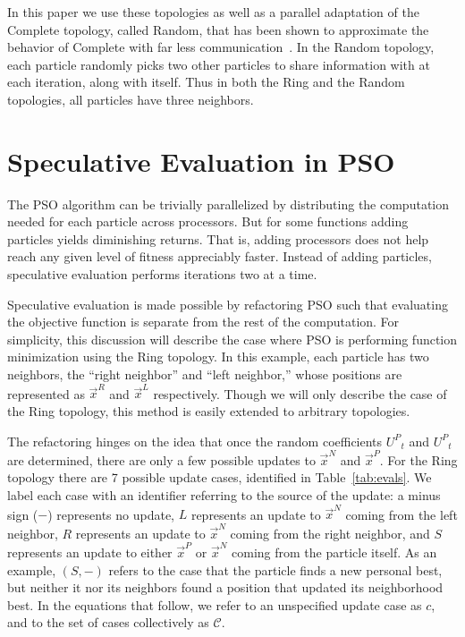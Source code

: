 \documentclass{llncs}
\providecommand{\pers}{\ensuremath{P}}
\providecommand{\neigh}{\ensuremath{N}}
\providecommand{\leftind}{\ensuremath{L}}
\providecommand{\rightind}{\ensuremath{R}}
\providecommand{\pURand}{\ensuremath{U^\pers}}
\providecommand{\nbest}{\ensuremath{\Vec{x}^\neigh}}
\providecommand{\pbest}{\ensuremath{\Vec{x}^\pers}}
\providecommand{\leftn}{\ensuremath{\Vec{x}^\leftind}}
\providecommand{\rightn}{\ensuremath{\Vec{x}^\rightind}}
\providecommand{\caseset}{\ensuremath{\mathcal{C}}}
\providecommand{\casegen}{\ensuremath{c}}
\providecommand{\casexn}{\ensuremath{(S,-)}}
\begin{document}
In this paper we use these topologies as well as a parallel adaptation of the
Complete topology, called Random, that has been shown to approximate the
behavior of Complete with far less
communication~\cite{mcnabb-2009-large-particle-swarms}.  In the Random
topology, each particle randomly picks two other particles to share information
with at each iteration, along with itself.  Thus in both the Ring and the
Random topologies, all particles have three neighbors.

\section{Speculative Evaluation in PSO}
\label{sec:sepso}

The PSO algorithm can be trivially parallelized by distributing the computation
needed for each particle across processors.  But for some functions adding
particles yields diminishing returns.  That is, adding processors does not help
reach any given level of fitness appreciably faster.  Instead of adding
particles, speculative evaluation performs iterations two at a time.

Speculative evaluation is made possible by refactoring PSO such that evaluating
the objective function is separate from the rest of the computation.  For
simplicity, this discussion will describe the case where PSO is performing
function minimization using the Ring topology.  In this example, each particle
has two neighbors, the ``right neighbor'' and ``left neighbor,'' whose
positions are represented as $\rightn$ and $\leftn$ respectively.  Though we
will only describe the case of the Ring topology, this method is easily
extended to arbitrary topologies.

The refactoring hinges on the idea that once the random coefficients
$\pURand_{t}$ and $\pURand_{t}$ are determined, there are only a few possible
updates to $\nbest$ and $\pbest$.  For the Ring topology there are 7 possible
update cases, identified in Table~\ref{tab:evals}.  We label each case with an
identifier referring to the source of the update: a minus sign ($-$) represents
no update, $L$ represents an update to $\nbest$ coming from the left neighbor,
$R$ represents an update to $\nbest$ coming from the right neighbor, and $S$
represents an update to either $\pbest$ or $\nbest$ coming from the particle
itself.  As an example, $\casexn$ refers to the case that the particle finds a
new personal best, but neither it nor its neighbors found a position that
updated its neighborhood best.  In the equations that follow, we refer to an
unspecified update case as $\casegen$, and to the set of cases collectively as
$\caseset$.
\end{document}
